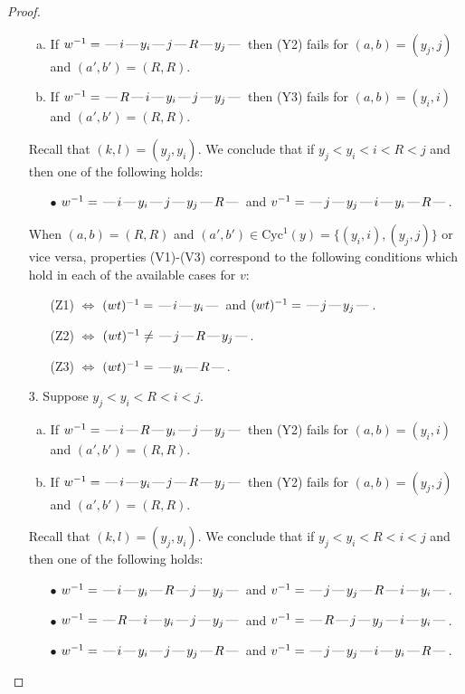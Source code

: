 \documentclass[10pt]{article}
\theoremstyle{definition}
\theoremstyle{definition}
\def\dash{\text{\hspace{0.5mm}---\hspace{0.5mm}}}
\def\Cyc{\mathrm{Cyc}}
\begin{document}
\begin{proof}
\begin{enumerate}
\begin{enumerate}[(a)]
\item If $w^{-1} = \dash i\dash y_i\dash j\dash R\dash y_j\dash $ then (Y2) fails for $(a,b)=(y_j,j)$ and $(a',b')=(R,R)$.
\item If $w^{-1} = \dash R\dash i\dash y_i\dash j\dash y_j\dash $ then (Y3) fails for $(a,b)=(y_i,i)$ and $(a',b')=(R,R)$.
\end{enumerate}
Recall that $(k,l) = (y_j,y_i)$.
We conclude that if $y_j < y_i < i < R < j$ and then one of the following holds:
\begin{enumerate}
\item[$\bullet$] $w^{-1} = \dash i\dash y_i\dash j\dash y_j\dash R\dash $ and $v^{-1} = \dash j\dash y_j\dash i\dash y_i\dash R\dash $.
\end{enumerate}
When $(a,b)= (R, R)$ and $(a',b')\in \Cyc^1(y)=\{(y_i,i),(y_j,j)\}$ or vice versa,
properties (V1)-(V3) correspond to the following conditions which hold in
each of the available cases for $v$:
\begin{enumerate}
\item[](Z1) $\Leftrightarrow$ $(wt)^{-1} = \dash i \dash y_i \dash$  and $(wt)^{-1} = \dash j \dash y_j \dash$.
\item[](Z2) $\Leftrightarrow$ $(wt)^{-1} \neq \dash j \dash R \dash y_j \dash$.
\item[](Z3) $\Leftrightarrow$ $(wt)^{-1} = \dash y_i \dash R \dash$.
\end{enumerate}
\item[$3$.] Suppose $y_j < y_i < R < i < j$.
\begin{enumerate}[(a)]
\item If $w^{-1} = \dash i\dash R\dash y_i\dash j\dash y_j\dash $ then (Y2) fails for $(a,b)=(y_i,i)$ and $(a',b')=(R,R)$.
\item If $w^{-1} = \dash i\dash y_i\dash j\dash R\dash y_j\dash $ then (Y2) fails for $(a,b)=(y_j,j)$ and $(a',b')=(R,R)$.
\end{enumerate}
Recall that $(k,l) = (y_j,y_i)$.
We conclude that if $y_j < y_i < R < i < j$ and then one of the following holds:
\begin{enumerate}
\item[$\bullet$] $w^{-1} = \dash i\dash y_i\dash R\dash j\dash y_j\dash $ and $v^{-1} = \dash j\dash y_j\dash R\dash i\dash y_i\dash $.
\item[$\bullet$] $w^{-1} = \dash R\dash i\dash y_i\dash j\dash y_j\dash $ and $v^{-1} = \dash R\dash j\dash y_j\dash i\dash y_i\dash $.
\item[$\bullet$] $w^{-1} = \dash i\dash y_i\dash j\dash y_j\dash R\dash $ and $v^{-1} = \dash j\dash y_j\dash i\dash y_i\dash R\dash $.

\end{enumerate}
\end{enumerate}
\end{proof}
\end{document}
